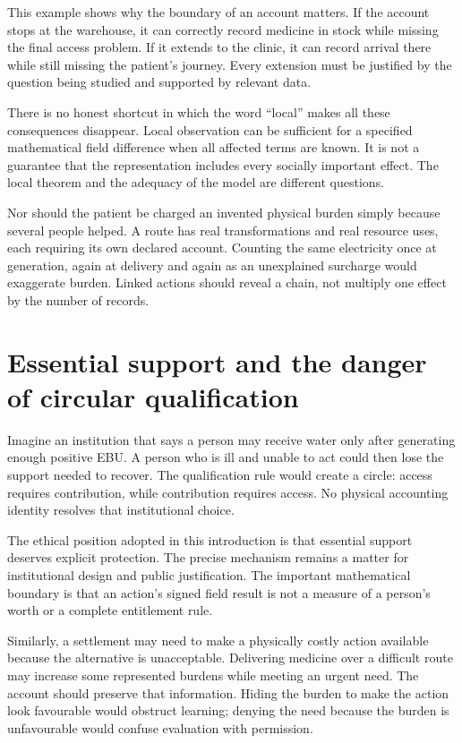 This example shows why the boundary of an account matters. If the account stops at the warehouse, it can correctly record medicine in stock while missing the final access problem. If it extends to the clinic, it can record arrival there while still missing the patient's journey. Every extension must be justified by the question being studied and supported by relevant data.

There is no honest shortcut in which the word ``local'' makes all these consequences disappear. Local observation can be sufficient for a specified mathematical field difference when all affected terms are known. It is not a guarantee that the representation includes every socially important effect. The local theorem and the adequacy of the model are different questions.

Nor should the patient be charged an invented physical burden simply because several people helped. A route has real transformations and real resource uses, each requiring its own declared account. Counting the same electricity once at generation, again at delivery and again as an unexplained surcharge would exaggerate burden. Linked actions should reveal a chain, not multiply one effect by the number of records.

\section{Essential support and the danger of circular qualification}
Imagine an institution that says a person may receive water only after generating enough positive EBU. A person who is ill and unable to act could then lose the support needed to recover. The qualification rule would create a circle: access requires contribution, while contribution requires access. No physical accounting identity resolves that institutional choice.

The ethical position adopted in this introduction is that essential support deserves explicit protection. The precise mechanism remains a matter for institutional design and public justification. The important mathematical boundary is that an action's signed field result is not a measure of a person's worth or a complete entitlement rule.

Similarly, a settlement may need to make a physically costly action available because the alternative is unacceptable. Delivering medicine over a difficult route may increase some represented burdens while meeting an urgent need. The account should preserve that information. Hiding the burden to make the action look favourable would obstruct learning; denying the need because the burden is unfavourable would confuse evaluation with permission.


